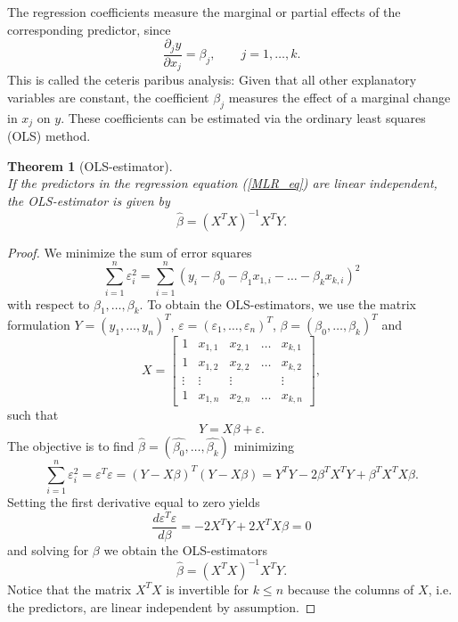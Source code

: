 \documentclass[a4paper, 12pt]{scrreprt}
\newtheorem{Theorem}{Theorem}[chapter]
\begin{document}
The regression coefficients measure the marginal or partial effects of the corresponding predictor, since
\begin{equation}
\frac{\partial_j y}{\partial x_j} = \beta_j, \qquad j=1,\ldots,k. 
\end{equation}
This is called the ceteris paribus analysis: Given that all other explanatory variables are constant, the coefficient $\beta_j$ measures the effect of a marginal change in $x_j$ on $y$.
These coefficients can be estimated via the ordinary least squares (OLS) method. 

\begin{Theorem}[OLS-estimator] \upshape $\text{ }$ \\
If the predictors in the regression equation (\ref{MLR_eq}) are linear independent, the OLS-estimator is given by 
\begin{equation}\label{OLS}
\hat{\beta} = (X^T X)^{-1} X^T Y.
\end{equation}
\end{Theorem}

\begin{proof}
We minimize the sum of error squares 
\begin{equation}
\sum_{i=1}^n \varepsilon_i^2 = \sum_{i=1}^n (y_i - \beta_0 - \beta_1 x_{1,i} - \ldots - \beta_k x_{k,i})^2
\end{equation}
with respect to $\beta_1, \ldots, \beta_k$.
To obtain the OLS-estimators, we use the matrix formulation $Y = (y_1, \ldots, y_n)^T$, $\varepsilon = (\varepsilon_1, \ldots, \varepsilon_n)^T$, $\beta = (\beta_0, \ldots, \beta_k)^T$ and
\begin{equation} \label{matrix:X}
X= 
\begin{bmatrix}
1 & x_{1,1} & x_{2,1} & \dots & x_{k,1} \\
1 & x_{1,2} & x_{2,2} & \dots & x_{k,2} \\
\vdots & \vdots & \vdots & & \vdots \\
1 & x_{1,n} & x_{2,n} & \dots & x_{k,n} \end{bmatrix}, 
\end{equation} 
such that
\begin{equation}\label{OLS:eq}
 Y = X\beta + \varepsilon.
\end{equation}
The objective is to find $\hat{\beta} = (\hat{\beta_0}, \ldots, \hat{\beta_k})$ minimizing 
\[  \sum_{i=1}^n \varepsilon_i^2 = \varepsilon^T \varepsilon  = ( Y- X\beta)^T (Y-X\beta)= Y^T Y - 2\beta^T X^T Y + \beta^T X^T X \beta. \]
Setting the first derivative equal to zero yields
\[ \frac{d \varepsilon^T \varepsilon}{d \beta} = -2X^T Y + 2 X^T X \beta = 0 \]
and solving for $\beta$ we obtain the OLS-estimators
\begin{equation*}
\hat{\beta} = (X^T X)^{-1} X^T Y.
\end{equation*}
Notice that the matrix $X^T X$ is invertible for $k \leq n$ because the columns of $X$, i.e. the predictors, are linear independent by assumption.
\end{proof}
\end{document}
